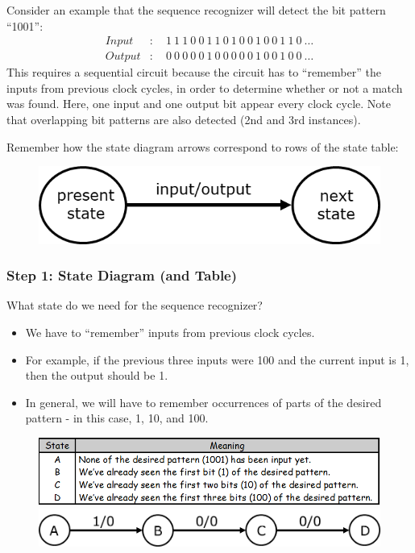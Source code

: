 Consider an example that the sequence recognizer will detect the bit pattern ``1001'':
\begin{align*}
  Input&:\quad 1\ 1\ 1\ 0\ 0\ 1\ 1\ 0\ 1\ 0\ 0\ 1\ 0\ 0\ 1\ 1\ 0\ \ldots\\ 
  Output&:\quad 0\ 0\ 0\ 0\ 0\ 1\ 0\ 0\ 0\ 0\ 0\ 1\ 0\ 0\ 1\ 0\ 0\ \ldots
\end{align*}
This requires a sequential circuit because the circuit has to ``remember'' the inputs from previous clock cycles, in order to determine whether or not a match was found. Here, one input and one output bit appear every clock cycle. Note that overlapping bit patterns are also detected (2nd and 3rd instances).

Remember how the state diagram arrows correspond to rows of the state table:
\begin{figure}[H]
  \centering
  \includegraphics[width=.5\linewidth]{img/design-example-state-diagram-0.png}
\end{figure}

\subsubsection{Step 1: State Diagram (and Table)}
\label{subsubsec:step1-state-diagram-table}

What state do we need for the sequence recognizer?
\begin{itemize}
  \item We have to ``remember'' inputs from previous clock cycles.
  \item For example, if the previous three inputs were 100 and the current input is 1, then the output should be 1.
  \item In general, we will have to remember occurrences of parts of the desired pattern - in this case, 1, 10, and 100.
\end{itemize}

\begin{figure}[H]
  \centering
  \begin{minipage}{\linewidth}
    \centering
    \includegraphics[width=\linewidth]{img/desing-example-table.png}
  \end{minipage}
  \begin{minipage}{\linewidth}
    \centering
    \includegraphics[width=\linewidth]{img/design-example-state-diagram.png}
  \end{minipage}
\end{figure}

